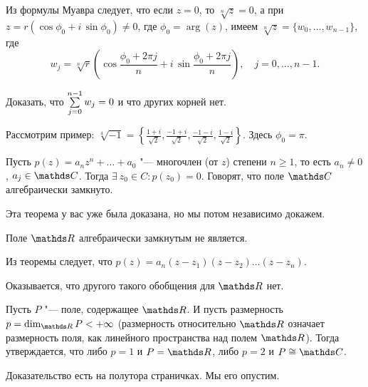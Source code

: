 Из формулы Муавра следует, что если $z=0$, то $\sqrt[n]z =0$, а при $z=r(\cos\phi_0 + i\,\sin \phi_0)\ne 0$, где $\phi_0 = \arg(z)$, имеем $\sqrt[n]z = \{w_0,\dots,w_{n-1}\}$, где 
\[
	w_j = \sqrt[n]r\left(\cos\frac{\phi_0+2\pi j}n + i\, \sin\frac{\phi_0+2\pi j}n\right),\quad j = 0,\dots,n-1.
\]
\begin{Task}
	Доказать, что $\sum\limits_{j = 0}^{n-1}w_j=0$ и что других корней нет.
\end{Task}
Рассмотрим пример: $\sqrt[4]{-1} = \left\{
	\frac{1+i}{\sqrt2},
	\frac{-1+i}{\sqrt2},
	\frac{-1-i}{\sqrt2},
	\frac{1-i}{\sqrt2}
\right\}$. Здесь $\phi_0=\pi$.
\begin{The}
	Пусть $p(z) = a_n z^n + \dots + a_0$ "--- многочлен (от $z$) степени $n\ge 1$, то есть $a_n\ne 0$, $a_j\in\C$. Тогда $\exists\ z_0\in C\colon p(z_0) = 0$. Говорят, что поле $\C$ алгебраически замкнуто.
\end{The}
Эта теорема у вас уже была доказана, но мы потом независимо докажем.

Поле $\R$ алгебраически замкнутым не является.

Из теоремы следует, что $p(z) = a_n(z-z_1)(z-z_2)\dots(z-z_{n})$.

Оказывается, что другого такого обобщения для $\R$ нет.
\begin{The}[Фробениуса]
	Пусть $P$ "--- поле, содержащее $\R$. И пусть размерность $p = \dim\limits_{\R} P<+\infty$ (размерность относительно $\R$ означает размерность поля, как линейного пространства над полем $\R$). Тогда утверждается, что либо $p=1$ и $P=\R$, либо $p=2$ и $P\cong \C$.
\end{The}
Доказательство есть на полутора страничках. Мы его опустим.
